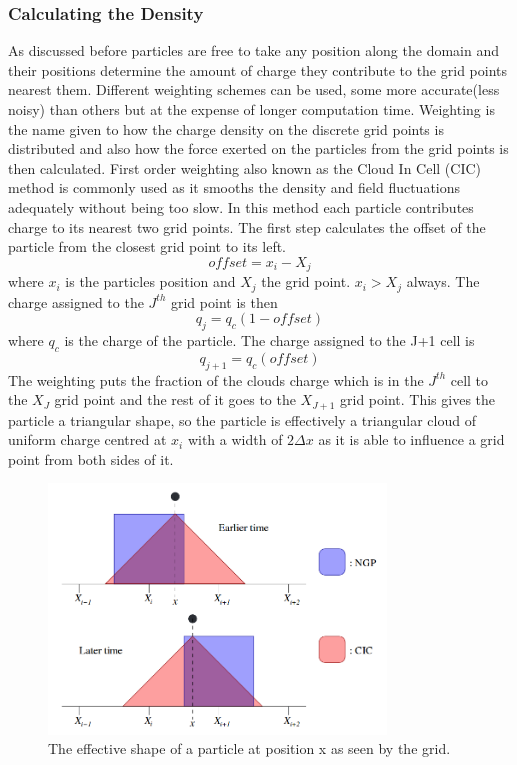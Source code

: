 \documentclass[12pt]{article}
\def\be{\begin{equation}}
\def\ee{\end{equation}}
\begin{document}
\subsubsection{Calculating the Density}
As discussed before particles are free to take any position along the domain and their positions determine the amount of charge they contribute to the grid points nearest them. Different weighting schemes can be used, some more accurate(less noisy) than others but at the expense of longer computation time. Weighting is the name given to how the charge density on the discrete grid points is distributed and also how the force exerted on the particles from the grid points is then calculated. 
First order weighting also known as the Cloud In Cell (CIC) method is commonly used as it smooths the density and field fluctuations adequately without being too slow. In this method each particle contributes charge to its nearest two grid points. The first step calculates the offset of the particle from the closest grid point to its left. 
\be
offset = x_i - X_j 
\ee 
where $x_i$ is the particles position and $X_j$ the grid point. $x_i > X_j$ always. The charge assigned to the $J^{th}$ grid point is then 
\be 
q_j = q_c \left(1 - offset\right)
\ee 
where $q_c$ is the charge of the particle. 
The charge assigned to the J+1 cell is 
\be 
q_{j+1} = q_c \left(offset\right)
\ee 
The weighting puts the fraction of the clouds charge which is in the $J^{th}$ cell to the $X_J$ grid point and the rest of it goes to the $X_{J+1}$ grid point. This  gives the particle a triangular shape, so the particle is effectively a triangular cloud of uniform charge centred at $x_i$ with a width of $2\Delta x$ as it is able to influence a grid point from both sides of it. 
\begin{figure}[H]
\centering
\includegraphics[width=0.8\textwidth]{particleshape}
\caption{The effective shape of a particle at position x as seen by the grid.\cite{shape}}
\label{fig:shape}
\end{figure}
\end{document}
